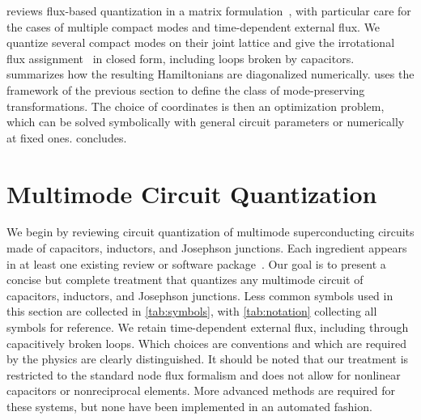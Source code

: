  reviews flux-based quantization in a matrix formulation~\cite{voolIntroductionQuantumElectromagnetic2017,blaisCircuitQuantumElectrodynamics2021a,krantzQuantumEngineersGuide2019a,Ciani2024lecture}, with particular care for the cases of multiple compact modes and time-dependent external flux.
We quantize several compact modes on their joint lattice and give the irrotational flux assignment~\cite{YouKoch2019} in closed form, including loops broken by capacitors.
 summarizes how the resulting Hamiltonians are diagonalized numerically.
 uses the framework of the previous section to define the class of mode-preserving transformations.
The choice of coordinates is then an optimization problem, which can be solved symbolically with general circuit parameters or numerically at fixed ones.
 concludes.


\section{Multimode Circuit Quantization}\label{sec:Lagrange}

We begin by reviewing circuit quantization of multimode superconducting circuits made of capacitors, inductors, and Josephson junctions.
Each ingredient appears in at least one existing review or software package~\cite{voolIntroductionQuantumElectromagnetic2017,blaisCircuitQuantumElectrodynamics2021a,krantzQuantumEngineersGuide2019a,rasmussenSuperconductingCircuitCompanionan2021a,groszkowskiScqubitsPythonPackage2021a,chittaComputeraidedQuantizationNumerical2022a,rajabzadehAnalysisArbitrarySuperconducting2023,Rajabzadeh2026generalframework,Wang2021,aumannCircuitQOpensourceToolbox2022,Ciani2024lecture,Lu2026systematic}.
Our goal is to present a concise but complete treatment that quantizes any multimode circuit of capacitors, inductors, and Josephson junctions.
Less common symbols used in this section are collected in \cref{tab:symbols}, with \cref{tab:notation} collecting all symbols for reference.
We retain time-dependent external flux, including through capacitively broken loops.
Which choices are conventions and which are required by the physics are clearly distinguished.
It should be noted that our treatment is restricted to the standard node flux formalism and does not allow for nonlinear capacitors or nonreciprocal elements.
More advanced methods \cite{osborne_symplectic_2023,OsborneFluxChargeSymmetricTheory2024,salcedoGyratorsSuperconductingCircuit2026,parra-rodriguez2023,parra-rodriguezExactQuantizationNonreciprocal2025, labarcaToolboxNonreciprocalDispersive2024} are required for these systems, but none have been implemented in an automated fashion.


